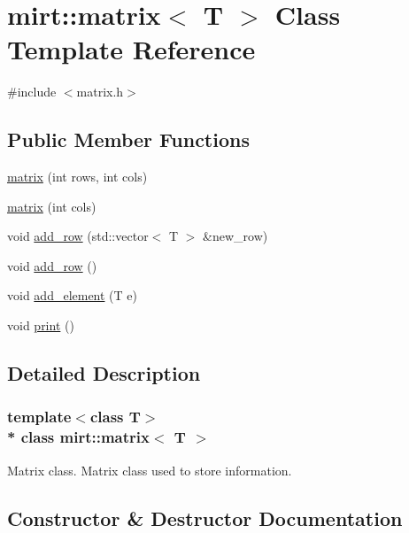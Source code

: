 \hypertarget{classmirt_1_1matrix}{}\section{mirt\+:\+:matrix$<$ T $>$ Class Template Reference}
\label{classmirt_1_1matrix}


{\ttfamily \#include $<$matrix.\+h$>$}

\subsection*{Public Member Functions}
\begin{DoxyCompactItemize}
\item 
\hyperlink{classmirt_1_1matrix_a283baccb8a0971f387dc06bc43938cea}{matrix} (int rows, int cols)
\item 
\hyperlink{classmirt_1_1matrix_a087ff2c390116144a149a25463778665}{matrix} (int cols)
\item 
void \hyperlink{classmirt_1_1matrix_abe4e475aefe0f247ba93f64f9e763c4a}{add\+\_\+row} (std\+::vector$<$ T $>$ \&new\+\_\+row)
\item 
void \hyperlink{classmirt_1_1matrix_a34dc35c2b12c0caf617c0a8e3031cb09}{add\+\_\+row} ()
\item 
void \hyperlink{classmirt_1_1matrix_aa1cdd1e063393fb855fe883b45b182ec}{add\+\_\+element} (T e)
\item 
void \hyperlink{classmirt_1_1matrix_afeff800c797c7b6745f8b2615de0a6bf}{print} ()
\end{DoxyCompactItemize}


\subsection{Detailed Description}
\subsubsection*{template$<$class T$>$\\*
class mirt\+::matrix$<$ T $>$}

Matrix class. Matrix class used to store information. 

\subsection{Constructor \& Destructor Documentation}
